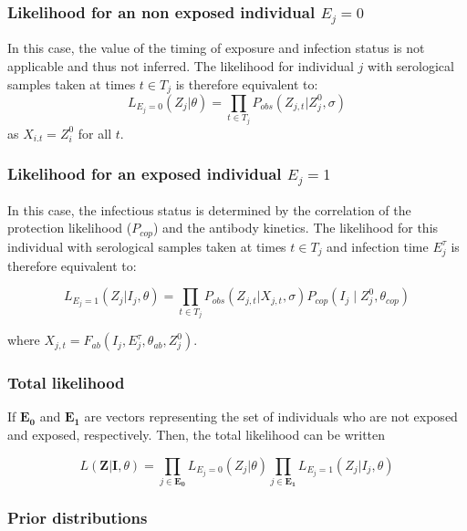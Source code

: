\documentclass{article}
\begin{document}
\subsubsection{Likelihood for an non exposed individual $E_j = 0$} 
In this case, the value of the timing of exposure and infection status is not applicable and thus not inferred. The likelihood for individual $j$ with serological samples taken at times $t\in T_j$ is therefore equivalent to:
\begin{equation}
L_{E_j = 0}(Z_{j}| \theta) = \prod_{t \in T_j}P_{obs}(Z_{j,t}|Z^0_{j}, \sigma)
\end{equation}
as $X_{i.t} = Z^0_{i}$ for all $t$.


\subsubsection{Likelihood for an exposed individual $E_j = 1$}
In this case, the infectious status is determined by the correlation of the protection likelihood ($P_{cop}$) and the antibody kinetics. The likelihood for this individual with serological samples taken at times $t\in T_j$ and infection time $E^\tau_j$ is therefore equivalent to:

\begin{equation}
L_{E_j = 1}(Z_{j}| I_j, \theta) = \prod_{t \in T_j}P_{obs}(Z_{j,t}| X_{j,t}, \sigma)P_{cop}(I_j \mid Z_{j}^0, \theta_{cop})
\end{equation}

where $X_{j,t} = F_{ab}( I_j,  E_j^\tau, \theta_{ab}, Z^0_j)$.


\subsubsection{Total likelihood}

If $\mathbf{E_0}$ and $\mathbf{E_1}$ are vectors representing the set of individuals who are not exposed and exposed, respectively. Then, the total likelihood can be written 

\begin{equation}
L(\mathbf{Z} | \mathbf{I}, \theta) = \prod_{j \in \mathbf{E_0}}L_{E_j = 0}(Z_{j}| \theta) \prod_{j \in \mathbf{E_1}}L_{E_j = 1}(Z_{j}| I_j, \theta) 
\end{equation}


\subsubsection{Prior distributions}
\end{document}
